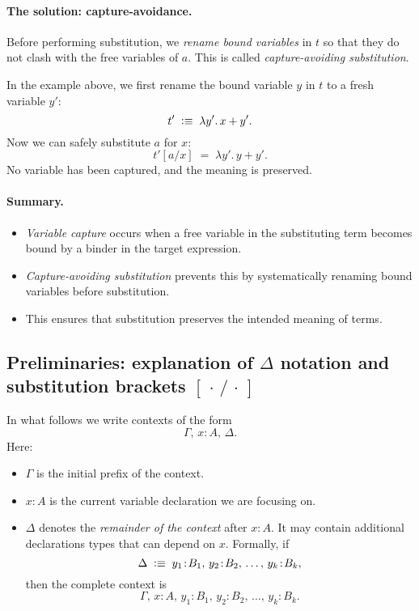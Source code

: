 \documentclass{article}
\newcommand{\defeq}{\vcentcolon\equiv}
\begin{document}
\paragraph{The solution: capture-avoidance.}

Before performing substitution, we \emph{rename bound variables} in \(t\)
so that they do not clash with the free variables of \(a\).
This is called \emph{capture-avoiding substitution}.

In the example above, we first rename the bound variable \(y\) in \(t\)
to a fresh variable \(y'\):
\[
t' \;\defeq\; \lambda y'.\,x + y'.
\]
Now we can safely substitute \(a\) for \(x\):
\[
t'[a/x] \;=\; \lambda y'.\,y + y'.
\]
No variable has been captured, and the meaning is preserved.

\paragraph{Summary.}
\begin{itemize}
  \item \emph{Variable capture} occurs when a free variable in the substituting term becomes bound by a binder in the target expression.
  \item \emph{Capture-avoiding substitution} prevents this by systematically renaming bound variables before substitution.
  \item This ensures that substitution preserves the intended meaning of terms.
\end{itemize}

\subsection*{Preliminaries: explanation of \texorpdfstring{$\Delta$}{Delta} notation and substitution brackets \texorpdfstring{$[\,\cdot\,/\,\cdot\,]$}{[./.]}}

In what follows we write contexts of the form
\[
\Gamma,\, x\!:\!A,\, \Delta.
\]
Here:
\begin{itemize}
  \item \(\Gamma\) is the initial prefix of the context.
  \item \(x\!:\!A\) is the current variable declaration we are focusing on.
  \item \(\Delta\) denotes the \emph{remainder of the context} after \(x\!:\!A\).  
  It may contain additional declarations types that can depend on \(x\).  
  Formally, if
  \[
  \Delta \;\defeq\; y_1\!:\!B_1,\, y_2\!:\!B_2,\, \dots,\, y_k\!:\!B_k,
  \]
  then the complete context is
  \[
  \Gamma,\, x\!:\!A,\, y_1\!:\!B_1,\, y_2\!:\!B_2,\, \dots,\, y_k\!:\!B_k.
  \]
\end{itemize}
\end{document}
